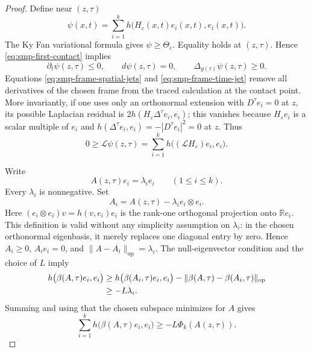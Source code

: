 \documentclass[10pt]{coll-l}
\theoremstyle{definition}
\theoremstyle{remark}
\numberwithin{section}{chapter}
\numberwithin{equation}{chapter}
\begin{document}
\begin{proof}
Define near $(z,\tau)$
\[
        \psi(x,t)=\sum_{i=1}^k
             h\bigl(H_\varepsilon(x,t)e_i(x,t),e_i(x,t)\bigr).
\]
The Ky Fan variational formula gives
$\psi\geq\Theta_\varepsilon$.  Equality holds at $(z,\tau)$.  Hence
\eqref{eq:smp-first-contact} implies
\begin{equation}
 \partial_t\psi(z,\tau)\leq0,
 \qquad
 d\psi(z,\tau)=0,
 \qquad
 \Delta_{g(\tau)}\psi(z,\tau)\geq0.                     \label{eq:smp-scalar-contact-jets}
\end{equation}
Equations \eqref{eq:smp-frame-spatial-jets} and
\eqref{eq:smp-frame-time-jet} remove all derivatives of the chosen frame
from the traced calculation at the contact point.  More invariantly, if
one uses only an orthonormal extension with $D^\tau e_i=0$ at $z$, its
possible Laplacian residual is
$2h(H_\varepsilon\Delta^\tau e_i,e_i)$; this vanishes because
$H_\varepsilon e_i$ is a scalar multiple of $e_i$ and
$h(\Delta^\tau e_i,e_i)=-|D^\tau e_i|^2=0$ at $z$.  Thus
\begin{equation}
 0\geq\mathcal L\psi(z,\tau)
   =\sum_{i=1}^k
       h\bigl((\mathcal LH_\varepsilon)e_i,e_i\bigr).     \label{eq:smp-contact-trace}
\end{equation}

Write
\[
                 A(z,\tau)e_i=\lambda_i e_i
       \qquad(1\leq i\leq k).
\]
Every $\lambda_i$ is nonnegative.  Set
\begin{equation}
                A_i=A(z,\tau)-\lambda_i e_i\otimes e_i.  \label{eq:smp-eigenvalue-deletion}
\end{equation}
Here $(e_i\otimes e_i)v=h(v,e_i)e_i$ is the rank-one orthogonal
projection onto $\mathbb Re_i$.
This definition is valid without any simplicity assumption on
$\lambda_i$: in the chosen orthonormal eigenbasis, it merely replaces one
diagonal entry by zero.  Hence $A_i\geq0$, $A_ie_i=0$, and
$\|A-A_i\|_{\mathrm{op}}=\lambda_i$.  The null-eigenvector condition and
the choice of $L$ imply
\begin{align}
 h\bigl(\beta(A,\tau)e_i,e_i\bigr)
 &\geq h\bigl(\beta(A_i,\tau)e_i,e_i\bigr)
      -\|\beta(A,\tau)-\beta(A_i,\tau)\|_{\mathrm{op}}\notag\\
 &\geq-L\lambda_i.                                      \label{eq:smp-beta-eigen-bound}
\end{align}
Summing and using that the chosen subspace minimizes for $A$ gives
\begin{equation}
 \sum_{i=1}^k h\bigl(\beta(A,\tau)e_i,e_i\bigr)
 \geq-L\Phi_k(A(z,\tau)).                                \label{eq:smp-beta-trace-bound}
\end{equation}


\end{proof}
\end{document}
